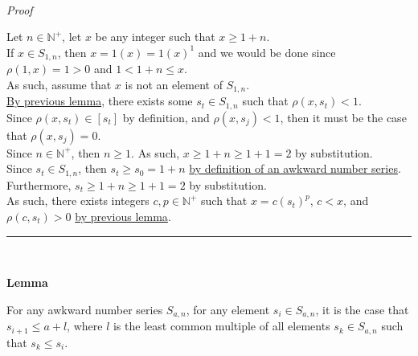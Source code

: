 \documentclass[a4paper,12pt]{article}
\begin{document}
\noindent \\
\textit{Proof}

\noindent Let $n \in \mathbb{N}^+$, let $x$ be any integer such that $x \geq 1 + n$.\\

\noindent If $x \in S_{1, n}$, then $x = 1(x) = 1(x)^1$ and we would be done since $\rho(1, x) = 1 > 0$ and $1 < 1 + n \leq x$.\\

\noindent As such, assume that $x$ is not an element of $S_{1, n}$.\\

\noindent \noindent \hyperlink{lemma:exists_element_less_than_x}{By previous lemma}, there exists some $s_t \in S_{1, n}$ such that $\rho(x, s_t) < 1$.\\

\noindent Since $\rho(x, s_t) \in [s_t]$ by definition, and $\rho(x, s_j) < 1$, then it must be the case that $\rho(x, s_j) = 0$.\\

\noindent Since $n \in \mathbb{N}^+$, then $n \geq 1$. As such, $x \geq 1 + n \geq 1 + 1 = 2$ by substitution.\\

\noindent Since $s_t \in S_{1, n}$, then $s_t \geq s_0 = 1 + n$ \hyperlink{definition:awkward_number_series}{by definition of an awkward number series}.\\

\noindent Furthermore, $s_t \geq 1 + n \geq 1 + 1 = 2$ by substitution.\\

\noindent As such, there exists integers $c, p \in \mathbb{N}^+$ such that $x = c(s_t)^p$, $c < x$, and $\rho(c, s_t) > 0$ \hyperlink{lemma:remainder_powers}{by previous lemma}.

\begin{center}
\noindent\rule{8cm}{0.4pt}
\end{center}
\noindent \\







\label{lemma:max_difference_of_elements}
\hypertarget{lemma:max_difference_of_elements}{}
\begin{tcolorbox}
\textbf{Lemma}

For any awkward number series $S_{a, n}$, for any element $s_i \in S_{a, n}$, it is the case that $s_{i + 1} \leq a + l$, where $l$ is the least common multiple of all elements $s_k \in S_{a, n}$ such that $s_k \leq s_i$.

\end{tcolorbox}
\end{document}
